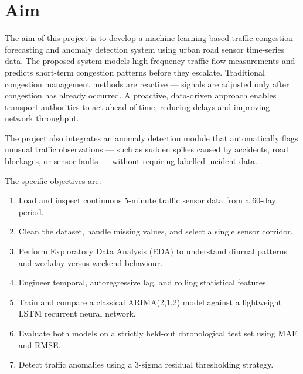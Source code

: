 \documentclass[12pt,a4paper]{article}
\begin{document}
\newpage
{}
\setcounter{page}{1}

\section{Aim}

The aim of this project is to develop a machine-learning-based traffic congestion forecasting
and anomaly detection system using urban road sensor time-series data.  The proposed
system models high-frequency traffic flow measurements and predicts short-term congestion
patterns before they escalate.  Traditional congestion management methods are reactive ---
signals are adjusted only after congestion has already occurred.  A proactive, data-driven
approach enables transport authorities to act ahead of time, reducing delays and
improving network throughput.

The project also integrates an anomaly detection module that automatically flags unusual
traffic observations --- such as sudden spikes caused by accidents, road blockages, or
sensor faults --- without requiring labelled incident data.

The specific objectives are:
\begin{enumerate}
  \item Load and inspect continuous 5-minute traffic sensor data from a 60-day period.
  \item Clean the dataset, handle missing values, and select a single sensor corridor.
  \item Perform Exploratory Data Analysis (EDA) to understand diurnal patterns and
        weekday versus weekend behaviour.
  \item Engineer temporal, autoregressive lag, and rolling statistical features.
  \item Train and compare a classical ARIMA(2,1,2) model against a lightweight LSTM
        recurrent neural network.
  \item Evaluate both models on a strictly held-out chronological test set using MAE
        and RMSE.
  \item Detect traffic anomalies using a 3-sigma residual thresholding strategy.
\end{enumerate}

\end{document}

